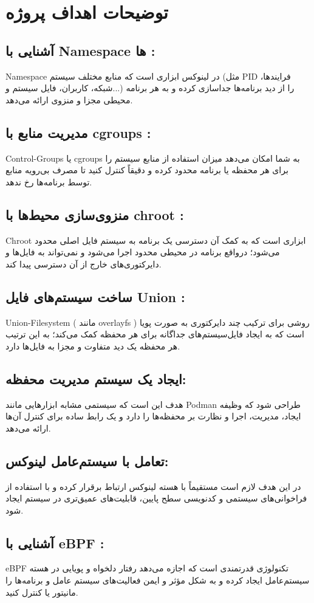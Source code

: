 \documentclass[10pt,a4paper]{article}
\begin{document}
\section{توضیحات اهداف پروژه}

\subsection{آشنایی با Namespace ها :}

Namespace در لینوکس ابزاری است که منابع مختلف سیستم (مثل PID فرایندها، شبکه، کاربران، فایل سیستم و...) را از دید برنامه‌ها جداسازی کرده و به هر برنامه محیطی مجزا و منزوی ارائه می‌دهد.


\subsection{مدیریت منابع با cgroups :}

Control-Groups یا cgroups به شما امکان می‌دهد میزان استفاده از منابع سیستم را برای هر محفظه یا برنامه محدود کرده و دقیقاً کنترل کنید تا مصرف بی‌رویه منابع توسط برنامه‌ها رخ ندهد.


\subsection{منزوی‌سازی محیط‌ها با chroot :}
Chroot ابزاری است که به کمک آن دسترسی یک برنامه به سیستم فایل اصلی محدود می‌شود؛ درواقع برنامه در محیطی محدود اجرا می‌شود و نمی‌تواند به فایل‌ها و دایرکتوری‌های خارج از آن دسترسی پیدا کند.

\subsection{ساخت سیستم‌های فایل Union :}
Union-Filesystem ( مانند overlayfs ) روشی برای ترکیب چند دایرکتوری به صورت پویا است که به ایجاد فایل‌سیستم‌های جداگانه برای هر محفظه کمک می‌کند؛ به این ترتیب هر محفظه یک دید متفاوت و مجزا به فایل‌ها دارد.

\subsection{ایجاد یک سیستم مدیریت محفظه:}
هدف این است که سیستمی مشابه ابزارهایی مانند Podman طراحی شود که وظیفه ایجاد، مدیریت، اجرا و نظارت بر محفظه‌ها را دارد و یک رابط ساده برای کنترل آن‌ها ارائه می‌دهد.

\subsection{تعامل با سیستم‌عامل لینوکس:}
در این هدف لازم است مستقیماً با هسته لینوکس ارتباط برقرار کرده و با استفاده از فراخوانی‌های سیستمی و کدنویسی سطح پایین، قابلیت‌های عمیق‌تری در سیستم ایجاد شود.

\subsection{آشنایی با eBPF :}
eBPF تکنولوژی قدرتمندی است که اجازه می‌دهد رفتار دلخواه و پویایی در هسته سیستم‌عامل ایجاد کرده و به شکل مؤثر و ایمن فعالیت‌های سیستم عامل و برنامه‌ها را مانیتور یا کنترل کنید.
\end{document}
